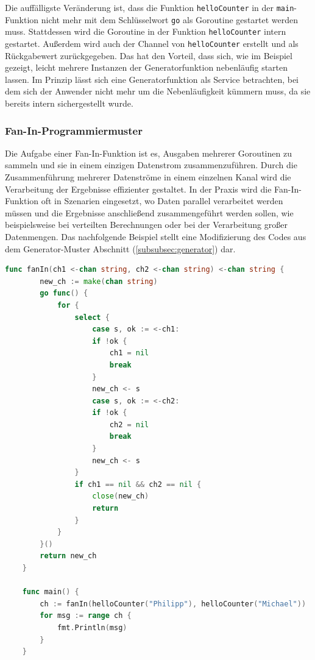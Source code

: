 \documentclass[fontsize=12pt,paper=a4,twoside=semi,parskip=half-,headsepline,headinclude]{scrreprt}
\begin{document}
Die auffälligste Veränderung ist, dass die Funktion \texttt{helloCounter} in der \texttt{main}-Funktion nicht mehr mit dem Schlüsselwort \texttt{go} als Goroutine gestartet werden muss. Stattdessen wird die Goroutine in der Funktion \texttt{helloCounter} intern gestartet. Außerdem wird auch der Channel von \texttt{helloCounter} erstellt und als Rückgabewert zurückgegeben. Das hat den Vorteil, dass sich, wie im Beispiel gezeigt, leicht mehrere Instanzen der Generatorfunktion nebenläufig starten lassen. Im Prinzip lässt sich eine Generatorfunktion als Service betrachten, bei dem sich der Anwender nicht mehr um die Nebenläufigkeit kümmern muss, da sie bereits intern sichergestellt wurde.

\subsubsection{Fan-In-Programmiermuster}

Die Aufgabe einer Fan-In-Funktion ist es, Ausgaben mehrerer Goroutinen zu sammeln und sie in einem einzigen Datenstrom zusammenzuführen. Durch die Zusammenführung mehrerer Datenströme in einem einzelnen Kanal wird die Verarbeitung der Ergebnisse effizienter gestaltet. In der Praxis wird die Fan-In-Funktion oft in Szenarien eingesetzt, wo Daten parallel verarbeitet werden müssen und die Ergebnisse anschließend zusammengeführt werden sollen, wie beispielsweise bei verteilten Berechnungen oder bei der Verarbeitung großer Datenmengen. Das nachfolgende Beispiel stellt eine Modifizierung des Codes aus dem Generator-Muster Abschnitt (\ref{subsubsec:generator}) dar.

\begin{lstlisting}[language=Go,extendedchars=true]
	func fanIn(ch1 <-chan string, ch2 <-chan string) <-chan string {
		new_ch := make(chan string)
		go func() {
			for {
				select {
					case s, ok := <-ch1:
					if !ok {
						ch1 = nil
						break
					}
					new_ch <- s
					case s, ok := <-ch2:
					if !ok {
						ch2 = nil
						break
					}
					new_ch <- s
				}
				if ch1 == nil && ch2 == nil {
					close(new_ch)
					return
				}
			}
		}()
		return new_ch
	}

	func main() {
		ch := fanIn(helloCounter("Philipp"), helloCounter("Michael"))
		for msg := range ch {
			fmt.Println(msg)
		}
	}
\end{lstlisting}
\end{document}
